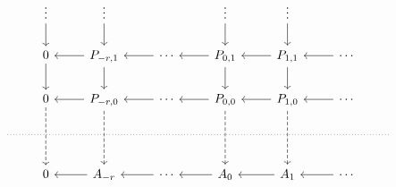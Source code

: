 \documentclass[main.tex]{subfiles}
\begin{document}
\begin{equation*}
  \begin{tikzcd}
    & \vdots
    \arrow[d]
    & \vdots
    \arrow[d]
    && \vdots
    \arrow[d]
    & \vdots
    \arrow[d]
    \\
    & 0
    \arrow[r, leftarrow]
    \arrow[d]
    & P_{-r,1}
    \arrow[r, leftarrow]
    \arrow[d]
    & \cdots
    \arrow[r, leftarrow]
    & P_{0,1}
    \arrow[r, leftarrow]
    \arrow[d]
    & P_{1,1}
    \arrow[r, leftarrow]
    \arrow[d]
    & \cdots
    \\
    & 0
    \arrow[r, leftarrow]
    \arrow[dd, dashed]
    & P_{-r,0}
    \arrow[r, leftarrow]
    \arrow[dd, dashed]
    & \cdots
    \arrow[r, leftarrow]
    & P_{0,0}
    \arrow[r, leftarrow]
    \arrow[dd, dashed]
    & P_{1,0}
    \arrow[r, leftarrow]
    \arrow[dd, dashed]
    & \cdots
    \\
    \
    \arrow[rrrrrrr, dotted, no head]
    &&&&&&& \
    \\
    & 0
    \arrow[r, leftarrow]
    & A_{-r}
    \arrow[r, leftarrow]
    & \cdots
    \arrow[r, leftarrow]
    & A_{0}
    \arrow[r, leftarrow]
    & A_{1}
    \arrow[r, leftarrow]
    & \cdots
  \end{tikzcd}
\end{equation*}
\end{document}
